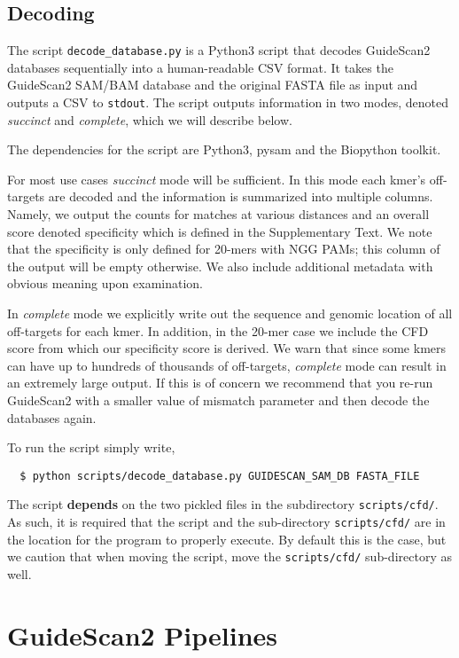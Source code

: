 \documentclass[10pt]{article}
\begin{document}
\subsection{Decoding}

The script \texttt{decode\_database.py} is a Python3 script that decodes
GuideScan2 databases sequentially into a human-readable CSV format. It
takes the GuideScan2 SAM/BAM database and the original FASTA file as
input and outputs a CSV to \texttt{stdout}. The script outputs
information in two modes, denoted {\it succinct} and {\it
  complete}, which we will describe below.

The dependencies for the script are Python3, pysam and the Biopython toolkit.

For most use cases {\it succinct} mode will be sufficient. In this
mode each kmer's off-targets are decoded and the information is
summarized into multiple columns. Namely, we output the counts for
matches at various distances and an overall score denoted specificity
which is defined in the Supplementary Text. We note that the
specificity is only defined for 20-mers with NGG PAMs; this column of
the output will be empty otherwise. We also include additional
metadata with obvious meaning upon examination.

In {\it complete} mode we explicitly write out the sequence and
genomic location of all off-targets for each kmer. In addition, in the
20-mer case we include the CFD score from which our specificity score
is derived. We warn that since some kmers can have up to hundreds of
thousands of off-targets, {\it complete} mode can result in an
extremely large output. If this is of concern we recommend that you
re-run GuideScan2 with a smaller value of mismatch parameter and then
decode the databases again.

To run the script simply write,
\begin{verbatim}
  $ python scripts/decode_database.py GUIDESCAN_SAM_DB FASTA_FILE 
\end{verbatim}
The script \textbf{depends} on the two pickled files in the
subdirectory \texttt{scripts/cfd/}. As such, it is required that the
script and the sub-directory \texttt{scripts/cfd/} are in the location
for the program to properly execute. By default this is the
case, but we caution that when moving the script, move the
\texttt{scripts/cfd/} sub-directory as well.

\section{GuideScan2 Pipelines}
\end{document}
